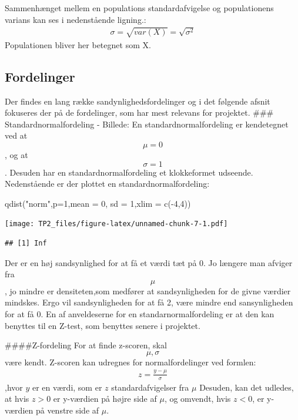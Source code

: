 \documentclass[
]{article}
\newenvironment{Shaded}{\begin{snugshade}}{\end{snugshade}}
\newcommand{\AttributeTok}[1]{\textcolor[rgb]{0.77,0.63,0.00}{#1}}
\newcommand{\DecValTok}[1]{\textcolor[rgb]{0.00,0.00,0.81}{#1}}
\newcommand{\FunctionTok}[1]{\textcolor[rgb]{0.00,0.00,0.00}{#1}}
\newcommand{\NormalTok}[1]{#1}
\newcommand{\SpecialCharTok}[1]{\textcolor[rgb]{0.00,0.00,0.00}{#1}}
\newcommand{\StringTok}[1]{\textcolor[rgb]{0.31,0.60,0.02}{#1}}
\begin{document}
Sammenhænget mellem en populations standardafvigelse og populationens
varians kan ses i nedenstående ligning.: \[
\begin{aligned}
\sigma=\sqrt{var(X)}=\sqrt{\sigma^2}
\end{aligned}
\] Populationen bliver her betegnet som X.

\hypertarget{fordelinger}{%
\subsection{Fordelinger}\label{fordelinger}}

Der findes en lang række sandynlighedsfordelinger og i det følgende
afsnit fokuseres der på de fordelinger, som har mest relevans for
projektet. \#\#\# Standardnormalfordeling - Billede: En
standardnormalfordeling er kendetegnet ved at \[\mu=0\], og at
\[\sigma = 1\]. Desuden har en standardnormalfordeling et klokkeformet
udseende. Nedenstående er der plottet en standardnormalfordeling:

\begin{Shaded}
\begin{Highlighting}[]
\FunctionTok{qdist}\NormalTok{(}\StringTok{"norm"}\NormalTok{,}\AttributeTok{p=}\DecValTok{1}\NormalTok{,}\AttributeTok{mean =} \DecValTok{0}\NormalTok{, }\AttributeTok{sd =} \DecValTok{1}\NormalTok{,}\AttributeTok{xlim =} \FunctionTok{c}\NormalTok{(}\SpecialCharTok{{-}}\DecValTok{4}\NormalTok{,}\DecValTok{4}\NormalTok{))}
\end{Highlighting}
\end{Shaded}

\texttt{[image: TP2\_files/figure-latex/unnamed-chunk-7-1.pdf]}

\begin{verbatim}
## [1] Inf
\end{verbatim}

Der er en høj sandsynlighed for at få et værdi tæt på 0. Jo længere man
afviger fra \[\mu\], jo mindre er densiteten,som medfører at
sandsynligheden for de givne værdier mindskes. Ergo vil sandsynligheden
for at få 2, være mindre end sansynligheden for at få 0. En af
anveldeserne for en standarnormalfordeling er at den kan benyttes til en
Z-test, som benyttes senere i projektet.

\#\#\#\#Z-fordeling For at finde z-scoren, skal \[\mu,\sigma\] være
kendt. Z-scoren kan udregnes for normalfordelinger ved formlen:
\[\begin{aligned}
  z = \frac{y-\mu}\sigma
  \end{aligned}\] ,hvor \(y\) er en værdi, som er \(z\)
standardafvigelser fra \(\mu\) Desuden, kan det udledes, at hvis \(z>0\)
er y-værdien på højre side af \(\mu\), og omvendt, hvis \(z<0\), er
y-værdien på venstre side af \(\mu\).
\end{document}
